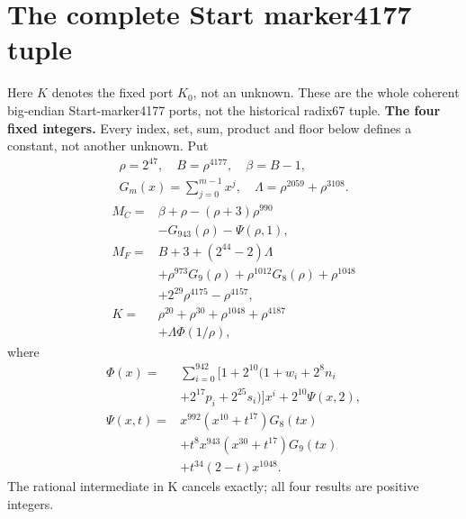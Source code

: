 \section{The complete Start marker4177 tuple}\label{app:4177}
\begingroup
\providecommand{\fl}[1]{\left\lfloor#1\right\rfloor}
\providecommand{\rg}[2]{\{#1,\ldots,#2\}}
Here $K$ denotes the fixed port $K_0$, not an unknown. These are the whole coherent big-endian Start-marker4177 ports, not the historical radix67 tuple.
\textbf{The four fixed integers.}
Every index, set, sum, product and floor below defines a constant, not
another unknown. Put
\[
\begin{gathered}
\rho=2^{47},\quad B=\rho^{4177},\quad\beta=B-1,\\
G_m(x)=\sum_{j=0}^{m-1}x^j,\quad
\Lambda=\rho^{2059}+\rho^{3108}.
\end{gathered}
\]
\begin{align*}
M_C={}&\beta+\rho-(\rho+3)\rho^{990}\\
&-G_{943}(\rho)-\Psi(\rho,1),\\
M_F={}&B+3+(2^{44}-2)\Lambda\\
&+\rho^{973}G_9(\rho)+\rho^{1012}G_8(\rho)
  +\rho^{1048}\\
&+2^{29}\rho^{4175}-\rho^{4157},\\
K={}&\rho^{20}+\rho^{30}+\rho^{1048}+\rho^{4187}\\
&+\Lambda\Phi(1/\rho),
\end{align*}
where
\[
\begin{split}
\Phi(x)={}&\sum_{i=0}^{942}[1+2^{10}(1+w_i+2^8n_i\\
&+2^{17}p_i+2^{25}s_i)]x^i+2^{10}\Psi(x,2),\\
\Psi(x,t)={}&x^{992}(x^{10}+t^{17})G_8(tx)\\
&+t^8x^{943}(x^{30}+t^{17})G_9(tx)\\
&+t^{34}(2-t)x^{1048}.
\end{split}
\]
The rational intermediate in K cancels exactly; all four results are positive integers.

